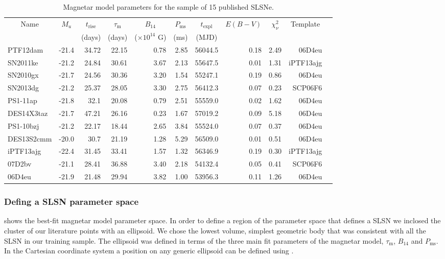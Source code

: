 \begin{table}
\begin{center}
\caption{Magnetar model parameters for the sample of 15 published SLSNe.}
\label{table:Magnetar}
\begin{tabular}{|l|r|r|r|r|r|r|r|r|r|r|}
\hline
  \multicolumn{1}{|c|}{Name} &
  \multicolumn{1}{c|}{$M_u$} &
  \multicolumn{1}{c|}{$t_\mathrm{rise}$} &
  \multicolumn{1}{c|}{$\tau_\mathrm{m}$} &
  \multicolumn{1}{c|}{$B_{14}$} &
  \multicolumn{1}{c|}{$P_{\mathrm{ms}}$} &
  \multicolumn{1}{c|}{$t_\mathrm{expl}$} &
  \multicolumn{1}{c|}{$E(B-V)$} &
  \multicolumn{1}{c|}{$\chi^2_{\nu}$} &
  \multicolumn{1}{c|}{Template} \\ & &
  \multicolumn{1}{c|}{(days)} &
  \multicolumn{1}{c|}{(days)} &
  \multicolumn{1}{c|}{($\times10^{14}$ G)} &
  \multicolumn{1}{c|}{(ms)} &
  \multicolumn{1}{c|}{(MJD)} & \\
\hline
  PTF12dam & -21.4 & 34.72 & 22.15 & 0.78 & 2.85 & 56044.5 & 0.18 & 2.49 & 06D4eu\\
  SN2011ke & -21.2 & 24.84 & 30.61 & 3.67 & 2.13 & 55647.5 & 0.01 & 1.31 & iPTF13ajg\\
  SN2010gx & -21.7 & 24.56 & 30.36 & 3.20 & 1.54 & 55247.1 & 0.19 & 0.86 & 06D4eu\\
  SN2013dg & -21.2 & 25.37 & 28.05 & 3.30 & 2.75 & 56412.3 & 0.07 & 0.23 & SCP06F6\\
  PS1-11ap & -21.8 & 32.1 & 20.08 & 0.79 & 2.51 & 55559.0 & 0.02 & 1.62 & 06D4eu\\
  DES14X3taz & -21.7 & 47.21 & 26.16 & 0.23 & 1.67 & 57019.2 & 0.09 & 5.18 & 06D4eu\\
  PS1-10bzj & -21.2 & 22.17 & 18.44 & 2.65 & 3.84 & 55524.0 & 0.07 & 0.37 & 06D4eu\\
  DES13S2cmm & -20.0 & 30.7 & 21.19 & 1.28 & 5.29 & 56509.0 & 0.01 & 0.51 & 06D4eu\\
  iPTF13ajg & -22.4 & 31.45 & 33.41 & 1.57 & 1.32 & 56346.9 & 0.19 & 0.30 & iPTF13ajg\\
  07D2bv & -21.1 & 28.41 & 36.88 & 3.40 & 2.18 & 54132.4 & 0.05 & 0.41 & SCP06F6\\
  06D4eu & -21.9 & 21.48 & 29.94 & 3.82 & 1.00 & 53956.3 & 0.11 & 1.26 & 06D4eu\\
\hline\end{tabular}
\end{center}
\end{table}

\subsubsection{Defing a SLSN parameter space}
 shows the best-fit magnetar model parameter space. In order to define a region of the parameter space that defines a SLSN we inclosed the cluster of our literature points with an ellipsoid. We chose the lowest volume, simplest geometric body that was consistent with all the SLSN in our training sample. The ellipsoid was defined in terms of the three main fit parameters of the magnetar model, $\tau_\mathrm{m}$, $B_{14}$ and $P_{\mathrm{ms}}$. In the Cartesian coordinate system a position on any generic ellipsoid can be defined using .

